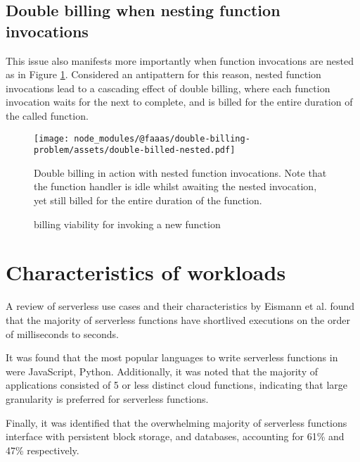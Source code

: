 \subsection{Double billing when nesting function invocations}
This issue also manifests more importantly when function invocations are nested as in Figure \ref{fig:double-billing-nested}. Considered an antipattern for this reason\cite{LambdaFunctionsCalling}, nested function invocations lead to a cascading effect of double billing, where each function invocation waits for the next to complete, and is billed for the entire duration of the called function.

\begin{figure}[t]
    \texttt{[image: node\_modules/@faaas/double-billing-problem/assets/double-billed-nested.pdf]}
    \caption{Double billing in action with nested function invocations. Note that the function handler is idle whilst awaiting the nested invocation, yet still billed for the entire duration of the function.}
    \label{fig:double-billing-nested}
\end{figure}

\begin{figure*}[t]
    \begin{center}
        
    \end{center}
    \caption{\faas{} billing viability for invoking a new function}
\end{figure*}

\section{Characteristics of \faas{} workloads}
A review of serverless use cases and their characteristics by Eismann et al.\cite{eismannReviewServerlessUse2020} found that the majority of serverless functions have shortlived executions on the order of milliseconds to seconds.

It was found that the most popular languages to write serverless functions in were JavaScript, Python. Additionally, it was noted that the majority of applications consisted of 5 or less distinct cloud functions, indicating that large granularity is preferred for serverless functions.

Finally, it was identified that the overwhelming majority of serverless functions interface with persistent block storage, and databases, accounting for 61\% and 47\% respectively.


